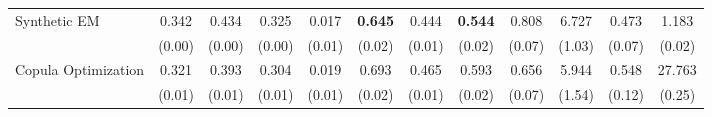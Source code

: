 \begin{table}[ht]
{\begin{tabular}{l cccc cccc cc c}
            \addlinespace[0.2em]
            Synthetic EM            & 0.342                                           & 0.434                                        & 0.325                                         & 0.017                   & \textbf{0.645   } & 0.444          & \textbf{0.544} & 0.808          & 6.727           & 0.473            & 1.183             \\
                                    & (0.00)                                          & (0.00)                                       & (0.00)                                        & (0.01)                  & (0.02)            & (0.01)         & (0.02)         & (0.07)         & (1.03)          & (0.07)           & (0.02)            \\
            \addlinespace[0.2em]
            Copula Optimization     & 0.321                                           & 0.393                                        & 0.304                                         & 0.019                   & 0.693             & 0.465          & 0.593          & 0.656          & 5.944           & 0.548            & 27.763            \\
                                    & (0.01)                                          & (0.01)                                       & (0.01)                                        & (0.01)                  & (0.02)            & (0.01)         & (0.02)         & (0.07)         & (1.54)          & (0.12)           & (0.25)            \\


\end{tabular}}
\end{table}
